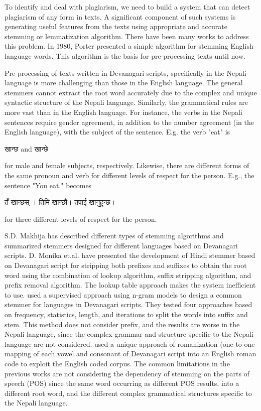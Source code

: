 \documentclass[conference]{IEEEtran}
\begin{document}
To identify and deal with plagiarism, we need to 
build a system that can detect
plagiarism of any form in texts. A significant component of such systems
is generating useful features from the texts using appropriate and
accurate stemming or lemmatization algorithm.
There have been many works to address this problem. In 1980, Porter 
presented a simple algorithm\cite{r2} for stemming English language words. 
This algorithm is the basis for pre-processing texts until now. 

Pre-processing of texts written in Devanagari scripts, specifically in the
Nepali language is more challenging than
those in the English language. The general stemmers cannot extract the root word
accurately due to the complex and unique syntactic structure of the Nepali
language. Similarly, the grammatical rules are more vast than in the English
language. For instance, the verbs in the Nepali sentences require gender 
agreement, in addition to the number agreement (in the English language), with 
the subject of the sentence. E.g. the verb "eat" is 
\begin{sanskrit}
  खान्छ  and खान्छे
\end{sanskrit}
for male and female subjects, respectively. 
Likewise, there are different forms of the same pronoun and verb
for different levels of respect for the person. E.g., the sentence "You eat."
becomes
\begin{sanskrit}
तँ  खान्छस् । 
तिमि खान्छौ। 
तपाई खानुहुन्छ।   
\end{sanskrit}
for three different levels of respect for the person.

S.D. Makhija \cite{makhija_study_2016} has described
different types of stemming
algorithms and summarized stemmers designed for different
languages based on Devanagari scripts. D. Monika et.al.
\cite{abhishek_effective_2013} have presented the development of Hindi stemmer
based on Devanagari script for stripping both prefixes and suffixes to obtain
the root word using the combination of lookup algorithm, suffix stripping
algorithm, and prefix removal algorithm. The lookup table approach makes the
system inefficient to use. \cite{dangui_lightweight_2015} used a supervised
approach using n-gram models to design a common stemmer for languages in
Devanagari scripts. They tested four approaches based on frequency,
statistics, length, and iterations to split the words into suffix and stem. This
method does not consider prefix, and the results are worse in the Nepali language,
since the complex grammar and structure specific to the Nepali language are not
considered. \cite{pande_devanagari_nodate} used a unique approach of
romanization (one to one mapping of each vowel and consonant of Devanagari
script into an English roman code to exploit the English coded corpus. The
common limitations in the previous works are not considering the dependency of
stemming on the parts of speech (POS) since the same word occurring as different
POS results, into a different root word, and the different complex grammatical
structures specific to the Nepali language.
\end{document}
